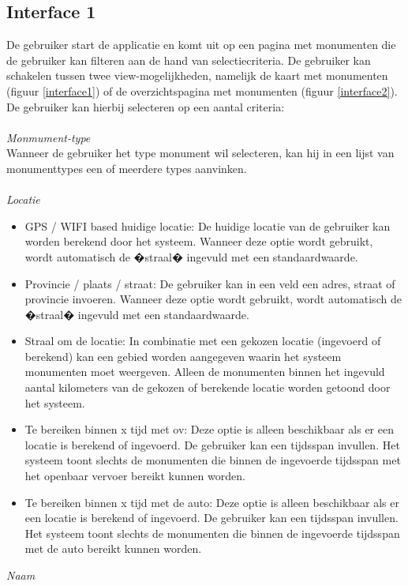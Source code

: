 \documentclass[a4paper,10pt]{article}
\begin{document}
			\subsection{Interface 1}
			De gebruiker start de applicatie en komt uit op een pagina met monumenten die de gebruiker kan filteren aan de hand van selectiecriteria. De gebruiker kan schakelen tussen twee view-mogelijkheden, namelijk de kaart met monumenten (figuur \ref{interface1}) of de overzichtspagina met monumenten (figuur \ref{interface2}). De gebruiker kan hierbij selecteren op een aantal criteria:\\
			\\
			\textit{Monmument-type}\\
			Wanneer de gebruiker het type monument wil selecteren, kan hij in een lijst van monumenttypes een of meerdere types aanvinken.\\
			\\
			\textit{Locatie}
			\begin{itemize}
				\item GPS / WIFI based huidige locatie: De huidige locatie van de gebruiker kan worden berekend door het systeem. Wanneer deze optie wordt gebruikt, wordt automatisch de �straal� ingevuld met een standaardwaarde. 
				\item Provincie / plaats / straat: De gebruiker kan in een veld een adres, straat of provincie invoeren. Wanneer deze optie wordt gebruikt, wordt automatisch de �straal� ingevuld met een standaardwaarde.
				\item Straal om de locatie: In combinatie met een gekozen locatie (ingevoerd of berekend) kan een gebied worden aangegeven waarin het systeem monumenten moet weergeven. Alleen de monumenten binnen het ingevuld aantal kilometers van de gekozen of berekende locatie worden getoond door het systeem.
				\item Te bereiken binnen x tijd met ov: Deze optie is alleen beschikbaar als er een locatie is berekend of ingevoerd. De gebruiker kan een tijdsspan invullen. Het systeem toont slechts de monumenten die binnen de ingevoerde tijdsspan met het openbaar vervoer bereikt kunnen worden.
				\item Te bereiken binnen x tijd met de auto: Deze optie is alleen beschikbaar als er een locatie is berekend of ingevoerd. De gebruiker kan een tijdsspan invullen. Het systeem toont slechts de monumenten die binnen de ingevoerde tijdsspan met de auto bereikt kunnen worden.
			\end{itemize}
			\textit{Naam}\\
\end{document}
